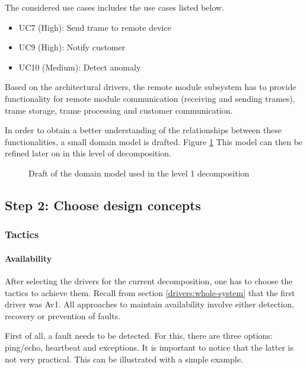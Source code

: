 \npar The considered use cases includes the use cases listed below. 

\begin{itemize}
	\item UC7 (High): Send trame to remote device
	\item UC9 (High): Notify customer
	\item UC10 (Medium): Detect anomaly
\end{itemize}

\npar Based on the architectural drivers, the remote module subsystem has to
provide functionality for remote module communication (receiving and sending
trames), trame storage, trame processing and customer communication. 

\npar In order to obtain a better understanding of the relationships between
these functionalities, a small domain model is drafted. Figure
\ref{fig:add/it1/draft} This model can then be refined later on
in this level of decomposition.

\begin{figure}[H]
	\begin{centering}
		\caption{Draft of the domain model used in the level 1 decomposition}
		\label{fig:add/it1/draft}
	\end{centering}
\end{figure}

\subsection{Step 2: Choose design concepts}
\label{add:it1/concepts}

\subsubsection{Tactics}
\label{add:it1/tactics}

\paragraph{Availability}

\npar After selecting the drivers for the current decomposition, one has to
choose the tactics to achieve them. Recall from section
\ref{drivers:whole-system} that the first driver was Av1. All approaches to
maintain availability involve either detection, recovery or prevention of
faults.

\npar First of all, a fault needs to be detected. For this, there are three
options: ping/echo, heartbeat and exceptions. It is important to notice that the
latter is not very practical. This can be illustrated with a simple example.

